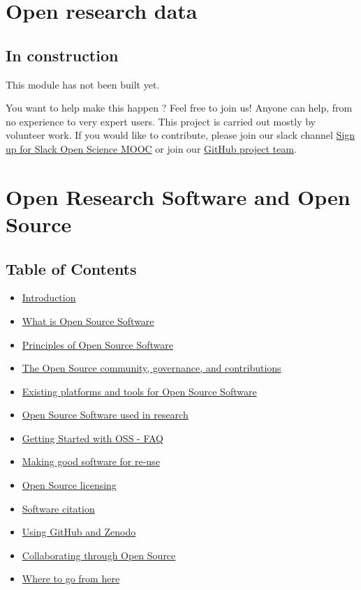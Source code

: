 \documentclass[]{book}
\providecommand{\tightlist}{%
  \setlength{\itemsep}{0pt}\setlength{\parskip}{0pt}}
\begin{document}
\hypertarget{module4}{%
\chapter{Open research data}\label{module4}}

\hypertarget{in-construction-2}{%
\section{In construction}\label{in-construction-2}}

This module has not been built yet.

You want to help make this happen ? Feel free to join us! Anyone can help, from no experience to very expert users. This project is carried out mostly by volunteer work. If you would like to contribute, please join our slack channel \href{https://osmooc.herokuapp.com/}{Sign up for Slack Open Science MOOC} or join our \href{https://open-science-mooc-invite.herokuapp.com/}{GitHub project team}.

\hypertarget{open-research-software-and-open-source}{%
\chapter{Open Research Software and Open Source}\label{open-research-software-and-open-source}}

\hypertarget{table-of-contents-1}{%
\section*{Table of Contents}\label{table-of-contents-1}}

\begin{itemize}
\tightlist
\item
  \protect\hyperlink{Introduction}{Introduction}
\item
  \protect\hyperlink{What_OSS}{What is Open Source Software}
\item
  \protect\hyperlink{Principles}{Principles of Open Source Software}
\item
  \protect\hyperlink{OS_Community}{The Open Source community, governance, and contributions}
\item
  \protect\hyperlink{Platforms}{Existing platforms and tools for Open Source Software}
\item
  \protect\hyperlink{Research}{Open Source Software used in research}
\item
  \protect\hyperlink{FAQ}{Getting Started with OSS - FAQ}
\item
  \protect\hyperlink{Reuse}{Making good software for re-use}
\item
  \protect\hyperlink{Licensing}{Open Source licensing}
\item
  \protect\hyperlink{Citation}{Software citation}
\item
  \protect\hyperlink{GitHub_Zenodo}{Using GitHub and Zenodo}
\item
  \protect\hyperlink{Collaborating}{Collaborating through Open Source}
\item
  \protect\hyperlink{Future_OSS}{Where to go from here}
\end{itemize}
\end{document}
